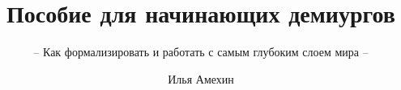 \documentclass[graybox,envcountchap,sectrefs,openany]{SNmono}
\begin{document}
\author{Илья Амехин}
\title{Пособие для начинающих демиургов}
\subtitle{-- Как формализировать и работать с самым глубоким слоем мира --}
\maketitle

\frontmatter%






\tableofcontents




\mainmatter%




\backmatter%


\printindex

\end{document}
